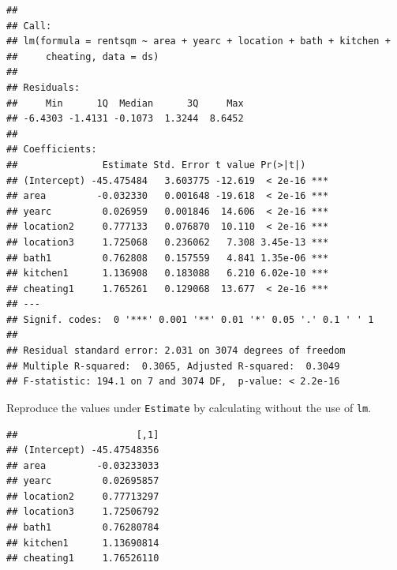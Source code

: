 \documentclass[
]{article}
\newenvironment{Shaded}{\begin{snugshade}}{\end{snugshade}}
\newcommand{\AttributeTok}[1]{\textcolor[rgb]{0.13,0.29,0.53}{#1}}
\newcommand{\CommentTok}[1]{\textcolor[rgb]{0.56,0.35,0.01}{\textit{#1}}}
\newcommand{\FunctionTok}[1]{\textcolor[rgb]{0.13,0.29,0.53}{\textbf{#1}}}
\newcommand{\NormalTok}[1]{#1}
\newcommand{\OtherTok}[1]{\textcolor[rgb]{0.56,0.35,0.01}{#1}}
\newcommand{\SpecialCharTok}[1]{\textcolor[rgb]{0.81,0.36,0.00}{\textbf{#1}}}
\begin{document}
\begin{verbatim}
## 
## Call:
## lm(formula = rentsqm ~ area + yearc + location + bath + kitchen + 
##     cheating, data = ds)
## 
## Residuals:
##     Min      1Q  Median      3Q     Max 
## -6.4303 -1.4131 -0.1073  1.3244  8.6452 
## 
## Coefficients:
##               Estimate Std. Error t value Pr(>|t|)    
## (Intercept) -45.475484   3.603775 -12.619  < 2e-16 ***
## area         -0.032330   0.001648 -19.618  < 2e-16 ***
## yearc         0.026959   0.001846  14.606  < 2e-16 ***
## location2     0.777133   0.076870  10.110  < 2e-16 ***
## location3     1.725068   0.236062   7.308 3.45e-13 ***
## bath1         0.762808   0.157559   4.841 1.35e-06 ***
## kitchen1      1.136908   0.183088   6.210 6.02e-10 ***
## cheating1     1.765261   0.129068  13.677  < 2e-16 ***
## ---
## Signif. codes:  0 '***' 0.001 '**' 0.01 '*' 0.05 '.' 0.1 ' ' 1
## 
## Residual standard error: 2.031 on 3074 degrees of freedom
## Multiple R-squared:  0.3065, Adjusted R-squared:  0.3049 
## F-statistic: 194.1 on 7 and 3074 DF,  p-value: < 2.2e-16
\end{verbatim}

Reproduce the values under \texttt{Estimate} by calculating without the
use of \texttt{lm}.

\begin{Shaded}
\end{Shaded}

\begin{verbatim}
##                     [,1]
## (Intercept) -45.47548356
## area         -0.03233033
## yearc         0.02695857
## location2     0.77713297
## location3     1.72506792
## bath1         0.76280784
## kitchen1      1.13690814
## cheating1     1.76526110
\end{verbatim}
\end{document}
